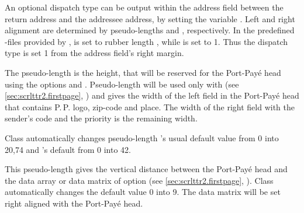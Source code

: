 \begin{Declaration}
\end{Declaration}
An optional dispatch type can be output within the address field between the
return address and the addressee address, by setting the variable
. Left and right alignment are determined by
pseudo-lengths  and
, respectively. In the predefined
-files
provided by \KOMAScript,  is set to rubber length
, while  is set to
1. Thus the dispatch type is set 1 from the address field's
right margin.
%
\EndIndexGroup


\begin{Declaration}
\end{Declaration}
The pseudo-length  is
the height, that will be reserved for the Port-Pay\'e head using the options
 and
%
. Pseudo-length
 will be used only with  (see
\autoref{sec:scrlttr2.firstpage},
) and gives the width of the left
field in the Port-Pay\'e head that contains P.\,P. logo, zip-code and
place. The width of the right field with the sender's code and the priority is
the remaining width.

Class  automatically changes
pseudo-length 's usual default value
from 0 into 20,74 and 's default from
0 into 42.%
%
\EndIndexGroup


\begin{Declaration}
\end{Declaration}
This pseudo-length gives the vertical
distance between the Port-Pay\'e head and the data array or data matrix of
option %
%
 (see \autoref{sec:scrlttr2.firstpage},
). Class
 automatically changes the default value 0 into
9. The data matrix will be set right aligned with the Port-Pay\'e
head.%
%
\EndIndexGroup
%
\EndIndexGroup


